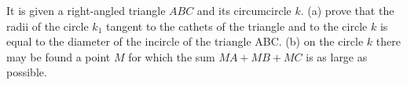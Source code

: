 It is given a right-angled triangle $ABC$ and its circumcircle $k$.
(a) prove that the radii of the circle $k_1$ tangent to the cathets of the triangle and to the circle $k$ is equal to the diameter of the incircle of the triangle ABC.
(b) on the circle $k$ there may be found a point $M$ for which the sum $MA+MB+MC$ is as large as possible.